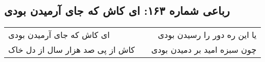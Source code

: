 \begin{center}
\section*{رباعی شماره ۱۶۳: ای کاش که جای آرمیدن بودی}
\label{sec:sh163}
\begin{longtable}{l p{0.5cm} r}
ای کاش که جای آرمیدن بودی
&&
یا این ره دور را رسیدن بودی
\\
کاش از پی صد هزار سال از دل خاک
&&
چون سبزه امید بر دمیدن بودی
\\
\end{longtable}
\end{center}
